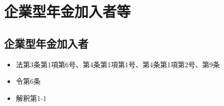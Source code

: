 \section{企業型年金加入者等}

\subsection{企業型年金加入者}

\begin{InyouJobunbox}
  \begin{itemize}
    \item 法第3条第1項第6号、第4条第1項第1号、第4条第1項第2号、第9条
    \item 令第6条
    \item 解釈第1-1
  \end{itemize}
\end{InyouJobunbox}

